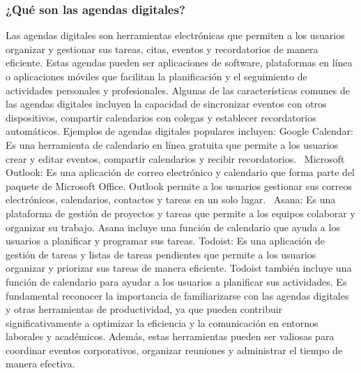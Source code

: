 \subsubsection{¿Qué son las agendas digitales?}
\hspace{1.27cm}Las agendas digitales son herramientas electrónicas que permiten a los usuarios organizar y gestionar sus tareas, citas, eventos y recordatorios de manera eficiente. Estas agendas pueden ser aplicaciones de software, plataformas en línea o aplicaciones móviles que facilitan la planificación y el seguimiento de actividades personales y profesionales. Algunas de las características comunes de las agendas digitales incluyen la capacidad de sincronizar eventos con otros dispositivos, compartir calendarios con colegas y establecer recordatorios automáticos.
Ejemplos de agendas digitales populares incluyen:
Google Calendar: Es una herramienta de calendario en línea gratuita que permite a los usuarios crear y editar eventos, compartir calendarios y recibir recordatorios. 
Microsoft Outlook: Es una aplicación de correo electrónico y calendario que forma parte del paquete de Microsoft Office. Outlook permite a los usuarios gestionar sus correos electrónicos, calendarios, contactos y tareas en un solo lugar. 
Asana: Es una plataforma de gestión de proyectos y tareas que permite a los equipos colaborar y organizar su trabajo. Asana incluye una función de calendario que ayuda a los usuarios a planificar y programar sus tareas.
Todoist: Es una aplicación de gestión de tareas y listas de tareas pendientes que permite a los usuarios organizar y priorizar sus tareas de manera eficiente. Todoist también incluye una función de calendario para ayudar a los usuarios a planificar sus actividades.
Es fundamental reconocer la importancia de familiarizarse con las agendas digitales y otras herramientas de productividad, ya que pueden contribuir significativamente a optimizar la eficiencia y la comunicación en entornos laborales y académicos. Además, estas herramientas pueden ser valiosas para coordinar eventos corporativos, organizar reuniones y administrar el tiempo de manera efectiva.